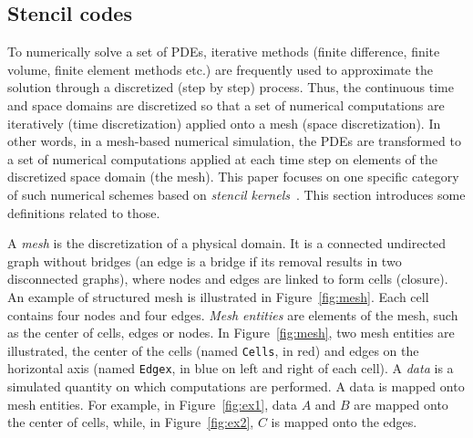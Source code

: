 \subsection{Stencil codes}
\label{sect:stencil}
To numerically solve a set of PDEs, iterative methods (finite difference, finite volume, finite element methods etc.) are frequently used to approximate the solution through a discretized (step by step) process. Thus, the continuous time and space domains are discretized so that a set of numerical computations are iteratively (time discretization) applied onto a mesh (space discretization). In other words, in a mesh-based numerical simulation, the PDEs are transformed to a set of numerical computations applied at each time step on elements of the discretized space domain (the mesh).
This paper focuses on one specific category of such numerical schemes based on \textit{stencil kernels}~\cite{spaaTangCKLL11}.
This section introduces some definitions related to those.

A \emph{mesh} is the discretization of a physical domain. It is a connected undirected graph without bridges (an edge is a bridge if its removal results in two disconnected graphs), where nodes and edges are linked to form cells (closure). An example of structured mesh is illustrated in Figure~\ref{fig:mesh}. Each cell contains four nodes and four edges. \emph{Mesh entities} are elements of the mesh, such as the center of cells, edges or nodes. In Figure~\ref{fig:mesh}, two mesh entities are illustrated, the center of the cells (named \texttt{Cells}, in red) and edges on the horizontal axis (named \texttt{Edgex}, in blue on left and right of each cell). A \emph{data} is a simulated quantity on which computations are performed. A data is mapped onto mesh entities. For example, in Figure~\ref{fig:ex1}, data $A$ and $B$ are mapped onto the center of cells, while, in Figure~\ref{fig:ex2}, $C$ is mapped onto the edges.

